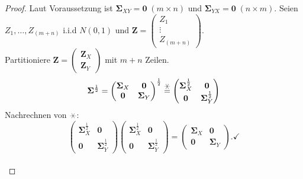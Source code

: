 \documentclass{tstextbook}
\begin{document}
\begin{proof}
	Laut Voraussetzung ist $ \boldsymbol{\Sigma}_{XY} = \boldsymbol{0} \; (m \times n) $  und $ \boldsymbol{\Sigma}_{YX} = \boldsymbol{0} \; (n \times m). $
	Seien $ Z_1,\ldots , Z_{(m+n)} $  i.i.d $ N(0,1) $ und $ \mathbf{Z}= \begin{pmatrix}
		 Z_1 \\ \vdots \\ Z_{(m+n)}
	\end{pmatrix} .$ \\
	Partitioniere $ \mathbf{Z} =  \begin{pmatrix} \mathbf{Z}_X \\ \mathbf{Z}_Y \end{pmatrix} $  mit $ m+n $ Zeilen.
	\[ \boldsymbol{\Sigma}^{\frac{1}{2}} = \begin{pmatrix}
		\boldsymbol{\Sigma}_X & \boldsymbol{0} \\
		\boldsymbol{0} & \boldsymbol{\Sigma}_Y
	\end{pmatrix}^{\frac{1}{2}} 
	\stackrel{\hexstar}{=}
	 \begin{pmatrix}
	\boldsymbol{\Sigma}_X^{\frac{1}{2}} & \boldsymbol{0} \\
	\boldsymbol{0} & \boldsymbol{\Sigma}_Y^{\frac{1}{2}}
	\end{pmatrix} \]
Nachrechnen von $ \hexstar $:
	\[ \begin{pmatrix}
		\boldsymbol{\Sigma}_X^{\frac{1}{2}} & \boldsymbol{0} \\
		\boldsymbol{0} & \boldsymbol{\Sigma}_Y^{\frac{1}{2}}
	\end{pmatrix}
	\begin{pmatrix}
		\boldsymbol{\Sigma}_X^{\frac{1}{2}} & \boldsymbol{0} \\
		\boldsymbol{0} & \boldsymbol{\Sigma}_Y^{\frac{1}{2}}
	\end{pmatrix}
	=
	\begin{pmatrix}
		\boldsymbol{\Sigma}_X & \boldsymbol{0} \\
		\boldsymbol{0} & \boldsymbol{\Sigma}_Y
	\end{pmatrix}. \checkmark \] \\


\end{proof}
\end{document}

